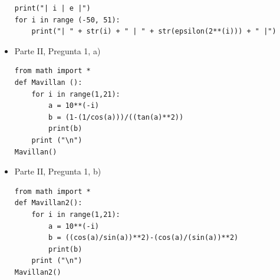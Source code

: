 \documentclass[10pt]{article}
\begin{document}
\begin{itemize}
\begin{verbatim}
print("| i | e |")
for i in range (-50, 51):
	print("| " + str(i) + " | " + str(epsilon(2**(i))) + " |")
\end{verbatim}
\item Parte II, Pregunta 1, a)
\begin{verbatim}
from math import *
def Mavillan ():
    for i in range(1,21):
        a = 10**(-i)
        b = (1-(1/cos(a)))/((tan(a)**2))
        print(b)
    print ("\n")
Mavillan()
\end{verbatim}

\item Parte II, Pregunta 1, b)
\begin{verbatim}
from math import *
def Mavillan2():
    for i in range(1,21):
        a = 10**(-i)
        b = ((cos(a)/sin(a))**2)-(cos(a)/(sin(a))**2)
        print(b)
    print ("\n")
Mavillan2()
\end{verbatim}

\end{itemize}
\end{document}
